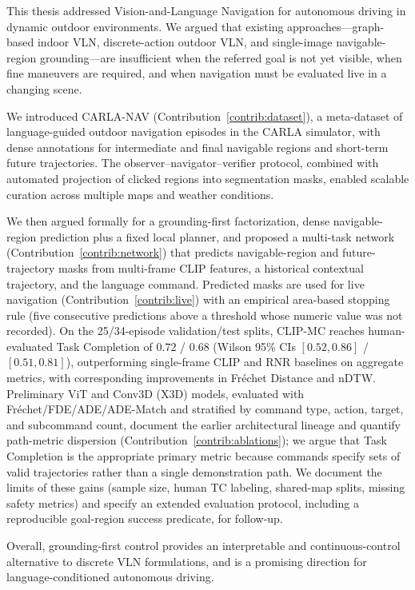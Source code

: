 This thesis addressed Vision-and-Language Navigation for autonomous driving in dynamic outdoor environments. We argued that existing approaches---graph-based indoor VLN, discrete-action outdoor VLN, and single-image navigable-region grounding---are insufficient when the referred goal is not yet visible, when fine maneuvers are required, and when navigation must be evaluated live in a changing scene.

We introduced CARLA-NAV (Contribution~\ref{contrib:dataset}), a meta-dataset of language-guided outdoor navigation episodes in the CARLA simulator, with dense annotations for intermediate and final navigable regions and short-term future trajectories. The observer--navigator--verifier protocol, combined with automated projection of clicked regions into segmentation masks, enabled scalable curation across multiple maps and weather conditions.

We then argued formally for a grounding-first factorization, dense navigable-region prediction plus a fixed local planner, and proposed a multi-task network (Contribution~\ref{contrib:network}) that predicts navigable-region and future-trajectory masks from multi-frame CLIP features, a historical contextual trajectory, and the language command. Predicted masks are used for live navigation (Contribution~\ref{contrib:live}) with an empirical area-based stopping rule (five consecutive predictions above a threshold whose numeric value was not recorded). On the 25/34-episode validation/test splits, CLIP-MC reaches human-evaluated Task Completion of $0.72$ / $0.68$ (Wilson 95\% CIs $[0.52,0.86]$ / $[0.51,0.81]$), outperforming single-frame CLIP and RNR baselines on aggregate metrics, with corresponding improvements in Fr\'{e}chet Distance and nDTW. Preliminary ViT and Conv3D (X3D) models, evaluated with Fr\'{e}chet/FDE/ADE/ADE-Match and stratified by command type, action, target, and subcommand count, document the earlier architectural lineage and quantify path-metric dispersion (Contribution~\ref{contrib:ablations}); we argue that Task Completion is the appropriate primary metric because commands specify sets of valid trajectories rather than a single demonstration path. We document the limits of these gains (sample size, human TC labeling, shared-map splits, missing safety metrics) and specify an extended evaluation protocol, including a reproducible goal-region success predicate, for follow-up.

Overall, grounding-first control provides an interpretable and continuous-control alternative to discrete VLN formulations, and is a promising direction for language-conditioned autonomous driving.

